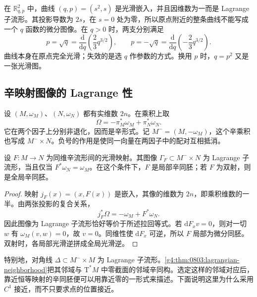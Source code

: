 \begin{example}\label{g4:exm:0804:folded-projection}
	在 \(\mathbb R^2_{q,p}\) 中，曲线 \((q,p)=(s^2,s)\) 是光滑嵌入，并且因维数为一而是 Lagrange 子流形。其投影导数为 \(2s\)，在 \(s=0\) 处为零，所以原点附近的整条曲线不能写成一个 \(q\) 函数的微分图像。在 \(q>0\) 时，两支分别满足
	\[
		p=\sqrt q=\frac{\mathrm{d}}{\mathrm{d}q}\left(\frac23q^{3/2}\right),
		\qquad
		p=-\sqrt q=\frac{\mathrm{d}}{\mathrm{d}q}\left(-\frac23q^{3/2}\right).
	\]
	曲线本身在原点完全光滑；失效的是选 \(q\) 作参数的方式。换用 \(p\) 时，\(q=p^2\) 又是一张光滑图。
\end{example}



\subsection{辛映射图像的 Lagrange 性}
\label{g4:subsec:0804:02}

设 \((M,\omega_M)\)、\((N,\omega_N)\) 都有实维数 \(2n\)。在乘积上取
\begin{equation}\label{g4:eq:0804:twisted-product}
	\Omega=-\pi_M^*\omega_M+\pi_N^*\omega_N.
\end{equation}
它在两个因子上分别非退化，因而是辛形式。记 \(M^-=(M,-\omega_M)\)，这个辛乘积也写成 \(M^-\times N\)。负号的作用是使同一向量在两因子中的配对互相抵消。

\begin{proposition}\label{g4:prop:0804:symplectic-graph}
	设 \(F:M\to N\) 为同维辛流形间的光滑映射。其图像 \(\Gamma_F\subset M^-\times N\) 为 Lagrange 子流形，当且仅当 \(F^*\omega_N=\omega_M\)。在这个条件下，\(F\) 是局部辛同胚；若 \(F\) 为双射，则是全局辛同胚。
\end{proposition}
\begin{proof}
	映射 \(j_F(x)=(x,F(x))\) 是嵌入，其像的维数为 \(2n\)，即乘积维数的一半。由两张投影的复合关系，
	\[
		j_F^*\Omega=-\omega_M+F^*\omega_N.
	\]
	因此图像为 Lagrange 子流形恰好等价于所述拉回等式。若 \(\mathrm{d}F_xv=0\)，则对一切 \(w\) 有 \(\omega_M(v,w)=0\)，故 \(v=0\)。同维性使 \(\mathrm{d}F_x\) 可逆，所以 \(F\) 局部为微分同胚。双射时，各局部光滑逆拼成全局光滑逆。
\end{proof}

特别地，对角线 \(\Delta\subset M^-\times M\) 为 Lagrange 子流形。\cref{g4:thm:0803:lagrangian-neighborhood}把其邻域与 \(\mathrm{T}^*M\) 中零截面的邻域辛同构。选定这样的邻域对应后，靠近恒等映射的辛同胚便可以用靠近零的一形式来描述。下面说明这里为什么采用 \(C^1\) 接近，而不只要求点的位置接近。\cite[第2.4节，第98--99页]{Cannas2006Symplectic}

